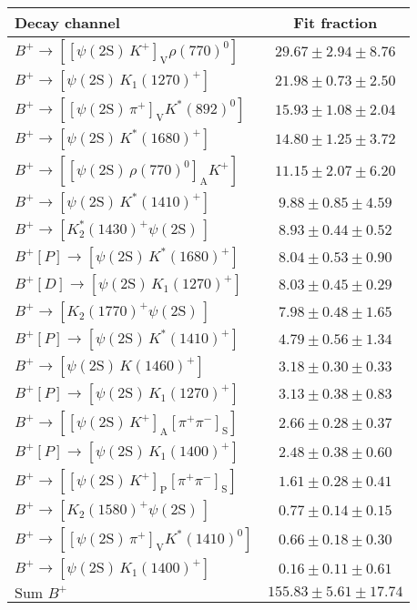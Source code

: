 \begin{tabular}{l c} 
\hline
\hline
Decay channel &  Fit fraction  \\ 
\hline
$B^{+}\rightarrow \left[\left[\psi(\text{2S})\,K^{+}\right]_{\text{V}}\rho(770)^{0}\right]$ & $29.67 \pm 2.94 \pm 8.76$ \\ 
$B^{+}\rightarrow \left[\psi(\text{2S})\,K_{1}(1270)^{+}\right]$ & $21.98 \pm 0.73 \pm 2.50$ \\ 
$B^{+}\rightarrow \left[\left[\psi(\text{2S})\,\pi^{+}\right]_{\text{V}}K^{*}(892)^{0}\right]$ & $15.93 \pm 1.08 \pm 2.04$ \\ 
$B^{+}\rightarrow \left[\psi(\text{2S})\,K^{*}(1680)^{+}\right]$ & $14.80 \pm 1.25 \pm 3.72$ \\ 
$B^{+}\rightarrow \left[\left[\psi(\text{2S})\,\rho(770)^{0}\right]_{\text{A}}K^{+}\right]$ & $11.15 \pm 2.07 \pm 6.20$ \\ 
$B^{+}\rightarrow \left[\psi(\text{2S})\,K^{*}(1410)^{+}\right]$ & $9.88 \pm 0.85 \pm 4.59$ \\ 
$B^{+}\rightarrow \left[K_{2}^{*}(1430)^{+}\psi(\text{2S})\,\right]$ & $8.93 \pm 0.44 \pm 0.52$ \\ 
$B^{+}\left[P\right]\rightarrow \left[\psi(\text{2S})\,K^{*}(1680)^{+}\right]$ & $8.04 \pm 0.53 \pm 0.90$ \\ 
$B^{+}\left[D\right]\rightarrow \left[\psi(\text{2S})\,K_{1}(1270)^{+}\right]$ & $8.03 \pm 0.45 \pm 0.29$ \\ 
$B^{+}\rightarrow \left[K_{2}(1770)^{+}\psi(\text{2S})\,\right]$ & $7.98 \pm 0.48 \pm 1.65$ \\ 
$B^{+}\left[P\right]\rightarrow \left[\psi(\text{2S})\,K^{*}(1410)^{+}\right]$ & $4.79 \pm 0.56 \pm 1.34$ \\ 
$B^{+}\rightarrow \left[\psi(\text{2S})\,K(1460)^{+}\right]$ & $3.18 \pm 0.30 \pm 0.33$ \\ 
$B^{+}\left[P\right]\rightarrow \left[\psi(\text{2S})\,K_{1}(1270)^{+}\right]$ & $3.13 \pm 0.38 \pm 0.83$ \\ 
$B^{+}\rightarrow \left[\left[\psi(\text{2S})\,K^{+}\right]_{\text{A}}\left[\pi^{+}\pi^{-}\right]_{\text{S}}\right]$ & $2.66 \pm 0.28 \pm 0.37$ \\ 
$B^{+}\left[P\right]\rightarrow \left[\psi(\text{2S})\,K_{1}(1400)^{+}\right]$ & $2.48 \pm 0.38 \pm 0.60$ \\ 
$B^{+}\rightarrow \left[\left[\psi(\text{2S})\,K^{+}\right]_{\text{P}}\left[\pi^{+}\pi^{-}\right]_{\text{S}}\right]$ & $1.61 \pm 0.28 \pm 0.41$ \\ 
$B^{+}\rightarrow \left[K_{2}(1580)^{+}\psi(\text{2S})\,\right]$ & $0.77 \pm 0.14 \pm 0.15$ \\ 
$B^{+}\rightarrow \left[\left[\psi(\text{2S})\,\pi^{+}\right]_{\text{V}}K^{*}(1410)^{0}\right]$ & $0.66 \pm 0.18 \pm 0.30$ \\ 
$B^{+}\rightarrow \left[\psi(\text{2S})\,K_{1}(1400)^{+}\right]$ & $0.16 \pm 0.11 \pm 0.61$ \\ 
$\text{Sum } B^{+}$ & $155.83 \pm 5.61 \pm 17.74$ \\ 
\hline
\hline
\end{tabular}
